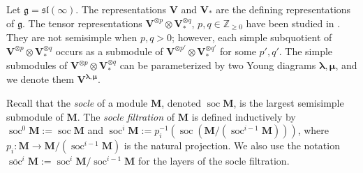\documentclass[12pt,oneside,english]{amsart}
\numberwithin{equation}{section}
\numberwithin{figure}{section}
\theoremstyle{plain}
\theoremstyle{plain}
\theoremstyle{remark}
\theoremstyle{definition}
\theoremstyle{plain}
\theoremstyle{remark}
\theoremstyle{definition}
\theoremstyle{plain}
\theoremstyle{plain}
\theoremstyle{definition}
\newcommand{\bV}{\mathbf{V}}
\newcommand{\bM}{\mathbf{M}}
\newcommand{\soc}{\operatorname{soc}}
\begin{document}
Let $\mathfrak{g}=\mathfrak{sl}(\infty)$.
The representations  $\bV$ and $\bV_{*}$ are the defining representations of $\mathfrak{g}$. The tensor representations $\bV^{\otimes p}\otimes \bV_{*}^{\otimes q}$, $p,q\in\mathbb{Z}_{\geq 0}$ have been studied in \cite{PStyr}. They are not semisimple when $p,q>0$; however, each simple subquotient of  $\bV^{\otimes p}\otimes \bV_{*}^{\otimes q}$ occurs as a submodule of $\bV^{\otimes p'}\otimes \bV_{*}^{\otimes q'}$ for some $p',q'$. The simple submodules of $\bV^{\otimes p}\otimes \bV_{*}^{\otimes q}$ can be parameterized by two Young diagrams $\boldsymbol{\lambda},\boldsymbol{\mu}$,   and we denote them $\bV^{\boldsymbol{\lambda},\boldsymbol{\mu}}$.



Recall that the {\em socle} of a module $\bM$, denoted $\soc\bM$,
is the largest semisimple submodule of $\bM$. The {\em socle filtration} of $\bM$ is defined inductively by $\soc^0 \bM:=\soc\bM$ and $\soc^i \bM:=p_i^{-1}(\soc (\bM/(\soc^{i-1}\bM)))$, where $p_i:\bM\to
\bM/(\soc^{i-1} \bM)$ is the natural projection.
 We also use the notation $\overline{\soc}^i \bM :=\soc^i \bM /\soc^{i-1} \bM $ for the layers of the socle filtration.
\end{document}

